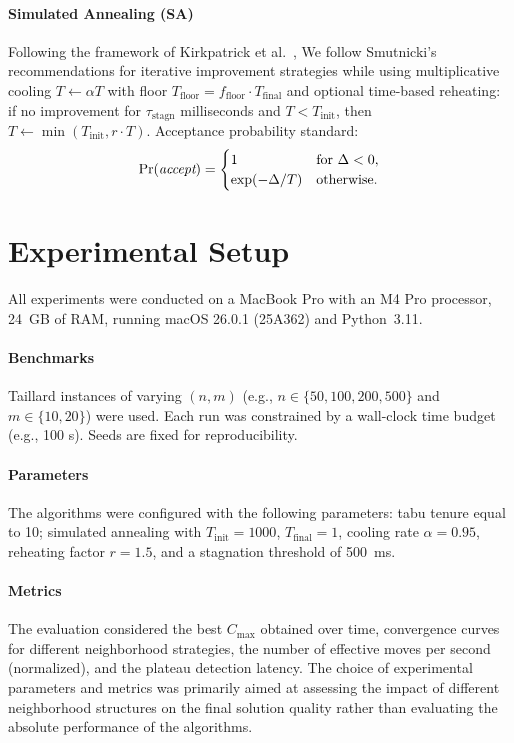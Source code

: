\documentclass[runningheads]{llncs}
\begin{document}
\paragraph{Simulated Annealing (SA)} Following the framework of Kirkpatrick et al.~\cite{kirkpatrick1983}, We follow Smutnicki's \cite{smutnicki2012} recommendations for iterative improvement strategies while using multiplicative cooling $T \leftarrow \alpha T$ with floor $T_{\text{floor}} = f_{\text{floor}} \cdot T_{\text{final}}$ and optional time-based reheating: if no improvement for $\tau_{\text{stagn}}$ milliseconds and $T < T_{\text{init}}$, then $T \leftarrow \min(T_{\text{init}}, r \cdot T)$. Acceptance probability standard:
\begin{equation}\label{Pr_accept}
    \Pr(\textit{accept}) =
    \begin{cases}
        1 & {\rm for~}\Delta < 0,\\
        \exp(-\Delta/T) & \text{otherwise}.
    \end{cases}
\end{equation}


\section{Experimental Setup}
All experiments were conducted on a MacBook Pro with an M4 Pro processor, 24~GB of RAM, running macOS 26.0.1 (25A362) and Python~3.11.

\paragraph{Benchmarks}
Taillard instances \cite{ref_taillard} of varying $(n,m)$ (e.g., $n\in\{50,100,200,500\}$ and $m\in\{10,20\}$) were used. Each run was constrained by a wall-clock time budget (e.g., 100 s). Seeds are fixed for reproducibility.

\paragraph{Parameters}
The algorithms were configured with the following parameters: tabu tenure equal to 10; simulated annealing with $T_{\text{init}}=1000$, $T_{\text{final}}=1$, cooling rate $\alpha=0.95$, reheating factor $r=1.5$, and a stagnation threshold of 500~ms.

\paragraph{Metrics}
The evaluation considered the best $C_{\max}$ obtained over time, convergence curves for different neighborhood strategies, the number of effective moves per second (normalized), and the plateau detection latency. The choice of experimental parameters and metrics was primarily aimed at assessing the impact of different neighborhood structures on the final solution quality rather than evaluating the absolute performance of the algorithms.
\end{document}

